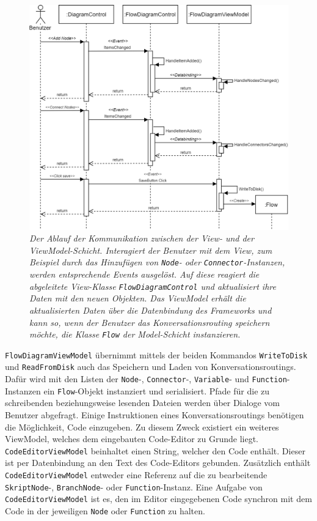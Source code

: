 \begin{figure} %
	\centering
		\includegraphics[width=\textwidth]{img/MVVMSequence.png}
	\caption[Kommunikationsablauf zwischen View- und ViewModel-Schicht]{\textit{Der Ablauf der Kommunikation zwischen der View- und der ViewModel-Schicht. Interagiert der Benutzer mit dem View, zum Beispiel durch das Hinzufügen von \texttt{Node}- oder \texttt{Connector}-Instanzen, werden entsprechende Events ausgelöst. Auf diese reagiert die abgeleitete View-Klasse \texttt{FlowDiagramControl} und aktualisiert ihre Daten mit den neuen Objekten. Das ViewModel erhält die aktualisierten Daten über die Datenbindung des Frameworks und kann so, wenn der Benutzer das Konversationsrouting speichern möchte, die Klasse \texttt{Flow} der Model-Schicht instanzieren.}}
	\label{fig:UML:MVVMSequence}
\end{figure}
\texttt{FlowDiagramViewModel} übernimmt mittels der beiden Kommandos \texttt{Write\-To\-Disk} und \texttt{Read\-From\-Disk} auch das Speichern und Laden von Konversationsroutings. Dafür wird mit den Listen der \texttt{Node}-, \texttt{Connector}-, \texttt{Variable}- und \texttt{Function}-Instanzen ein \texttt{Flow}-Objekt instanziert und serialisiert. Pfade für die zu schreibenden beziehungsweise lesenden Dateien werden über Dialoge vom Benutzer abgefragt.
\newline
Einige Instruktionen eines Konversationsroutings benötigen die Möglichkeit, Code einzugeben. Zu diesem Zweck existiert ein weiteres ViewModel, welches dem eingebauten Code-Editor zu Grunde liegt. \texttt{CodeEditorViewModel} beinhaltet einen String, welcher den Code enthält. Dieser ist per Datenbindung an den Text des Code-Editors gebunden. Zusätzlich enthält \texttt{CodeEditorViewModel} entweder eine Referenz auf die zu bearbeitende \texttt{SkriptNode}-, \texttt{BranchNode}- oder \texttt{Function}-Instanz. Eine Aufgabe von \texttt{CodeEditorViewModel} ist es, den im Editor eingegebenen Code synchron mit dem Code in der jeweiligen \texttt{Node} oder \texttt{Function} zu halten. 
